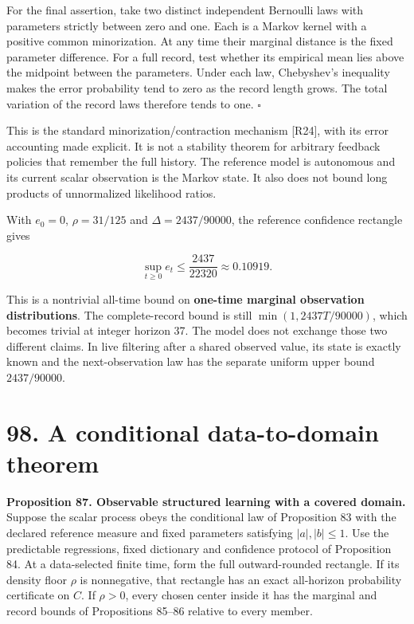 \documentclass[11pt,letterpaper]{article}
\begin{document}
For the final assertion, take two distinct independent Bernoulli laws
with parameters strictly between zero and one. Each is a Markov kernel
with a positive common minorization. At any time their marginal distance
is the fixed parameter difference. For a full record, test whether its
empirical mean lies above the midpoint between the parameters. Under
each law, Chebyshev's inequality makes the error probability tend to
zero as the record length grows. The total variation of the record laws
therefore tends to one. \(\square\)

This is the standard minorization/contraction mechanism {[}R24{]}, with
its error accounting made explicit. It is not a stability theorem for
arbitrary feedback policies that remember the full history. The
reference model is autonomous and its current scalar observation is the
Markov state. It also does not bound long products of unnormalized
likelihood ratios.

With \(e_0=0\), \(\rho=31/125\) and \(\Delta=2437/90000\), the reference
confidence rectangle gives

\[
\boxed{
\sup_{t\geq0}e_t\leq\frac{2437}{22320}
\approx0.10919.
}
\]

This is a nontrivial all-time bound on \textbf{one-time marginal
observation distributions}. The complete-record bound is still
\(\min(1,2437T/90000)\), which becomes trivial at integer horizon 37.
The model does not exchange those two different claims. In live
filtering after a shared observed value, its state is exactly known and
the next-observation law has the separate uniform upper bound
\(2437/90000\).

\newpage

\section{98. A conditional data-to-domain
theorem}\label{a-conditional-data-to-domain-theorem}

\textbf{Proposition 87. Observable structured learning with a covered
domain.} Suppose the scalar process obeys the conditional law of
Proposition 83 with the declared reference measure and fixed parameters
satisfying \(|a|,|b|\leq1\). Use the predictable regressions, fixed
dictionary and confidence protocol of Proposition 84. At a data-selected
finite time, form the full outward-rounded rectangle. If its density
floor \(\rho\) is nonnegative, that rectangle has an exact all-horizon
probability certificate on \(C\). If \(\rho>0\), every chosen center
inside it has the marginal and record bounds of Propositions 85--86
relative to every member.
\end{document}
